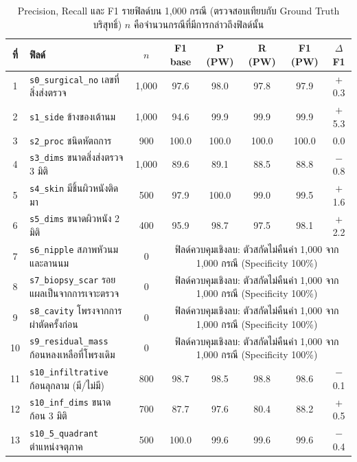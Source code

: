 \begin{table}[H]
\centering
\caption{Precision, Recall และ F1 รายฟิลด์บน 1,000 กรณี (ตรวจสอบเทียบกับ Ground Truth บริสุทธิ์) $n$ คือจำนวนกรณีที่มีการกล่าวถึงฟิลด์นั้น}
\label{tab:field}
\footnotesize\setlength{\tabcolsep}{3pt}
\begin{tabular}{|c|p{4.6cm}|c|c|c|c|c|c|}
\hline
\textbf{ที่} & \textbf{ฟิลด์} & \textbf{$n$} & \textbf{F1 base} & \textbf{P (PW)} & \textbf{R (PW)} & \textbf{F1 (PW)} & \textbf{$\Delta$F1} \\
\hline
1 & \texttt{s0\_surgical\_no} เลขที่สิ่งส่งตรวจ & 1,000 & 97.6 & 98.0 & 97.8 & 97.9 & $+$0.3 \\
\hline
2 & \texttt{s1\_side} ข้างของเต้านม & 1,000 & 94.6 & 99.9 & 99.9 & 99.9 & $+$5.3 \\
\hline
3 & \texttt{s2\_proc} ชนิดหัตถการ & 900 & 100.0 & 100.0 & 100.0 & 100.0 & 0.0 \\
\hline
4 & \texttt{s3\_dims} ขนาดสิ่งส่งตรวจ 3 มิติ & 1,000 & 89.6 & 89.1 & 88.5 & 88.8 & $-$0.8 \\
\hline
5 & \texttt{s4\_skin} มีชิ้นผิวหนังติดมา & 500 & 97.9 & 100.0 & 99.0 & 99.5 & $+$1.6 \\
\hline
6 & \texttt{s5\_dims} ขนาดผิวหนัง 2 มิติ & 400 & 95.9 & 98.7 & 97.5 & 98.1 & $+$2.2 \\
\hline
7 & \texttt{s6\_nipple} สภาพหัวนมและลานนม & 0 & \multicolumn{5}{p{7.4cm}|}{ฟิลด์ควบคุมเชิงลบ: ตัวสกัดไม่คืนค่า 1,000 จาก 1,000 กรณี (Specificity 100\%)} \\
\hline
8 & \texttt{s7\_biopsy\_scar} รอยแผลเป็นจากการเจาะตรวจ & 0 & \multicolumn{5}{p{7.4cm}|}{ฟิลด์ควบคุมเชิงลบ: ตัวสกัดไม่คืนค่า 1,000 จาก 1,000 กรณี (Specificity 100\%)} \\
\hline
9 & \texttt{s8\_cavity} โพรงจากการผ่าตัดครั้งก่อน & 0 & \multicolumn{5}{p{7.4cm}|}{ฟิลด์ควบคุมเชิงลบ: ตัวสกัดไม่คืนค่า 1,000 จาก 1,000 กรณี (Specificity 100\%)} \\
\hline
10 & \texttt{s9\_residual\_mass} ก้อนหลงเหลือที่โพรงเดิม & 0 & \multicolumn{5}{p{7.4cm}|}{ฟิลด์ควบคุมเชิงลบ: ตัวสกัดไม่คืนค่า 1,000 จาก 1,000 กรณี (Specificity 100\%)} \\
\hline
11 & \texttt{s10\_infiltrative} ก้อนลุกลาม (มี/ไม่มี) & 800 & 98.7 & 98.5 & 98.8 & 98.6 & $-$0.1 \\
\hline
12 & \texttt{s10\_inf\_dims} ขนาดก้อน 3 มิติ & 700 & 87.7 & 97.6 & 80.4 & 88.2 & $+$0.5 \\
\hline
13 & \texttt{s10\_5\_quadrant} ตำแหน่งจตุภาค & 500 & 100.0 & 99.6 & 99.6 & 99.6 & $-$0.4 \\

\end{tabular}
\end{table}
